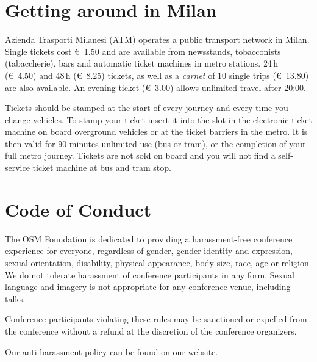 \section*{Getting around in Milan}
\label{getting-around}
\pagestyle{cropmarksstyle}
Azienda Trasporti Milanesi (ATM) operates a public transport network in Milan. Single tickets cost
€~1.50 and are available from newsstands, tobacconists (tabaccherie), bars and automatic ticket
machines in metro stations. 24\,h (€~4.50) and 48\,h (€~8.25) tickets, as well as a \emph{carnet} of 10 single
trips (€~13.80) are also available. An evening ticket (€~3.00) allows unlimited travel after 20:00.

Tickets should be stamped at the start of every journey and every time you change vehicles. To stamp
your ticket insert it into the slot in the electronic ticket machine on board overground vehicles or
at the ticket barriers in the metro. It is then valid for 90 minutes unlimited use (bus or tram), or
the completion of your full metro journey. Tickets are not sold on board and you will not find a
self-service ticket machine at bus and tram stop.

\section*{Code of Conduct}
\label{coc}
The OSM Foundation is dedicated to providing a harassment-free
conference experience for everyone, regardless of gender, gender identity
and expression, sexual orientation, disability, physical appearance, body
size, race, age or religion. We do not tolerate harassment of conference
participants in any form. Sexual language and imagery is not appropriate
for any conference venue, including talks.

Conference participants violating these rules may be sanctioned or
expelled from the conference without a refund at the discretion of the
conference organizers.

Our anti-harassment policy can be found on our website.
